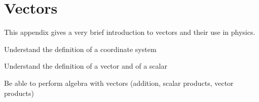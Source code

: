 \chapter{Vectors}
\label{app:vectors}
This appendix gives a very brief introduction to vectors and their use in physics.
 \vspace{1cm}
\begin{learningObjectives}
\item Understand the definition of a coordinate system
\item Understand the definition of a vector and of a scalar
\item Be able to perform algebra with vectors (addition, scalar products, vector products)
\end{learningObjectives}


